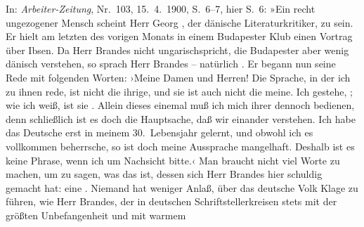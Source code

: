 \begin{ledgroupsized}[t]{13cm}
{{{                     In: \emph{Arbeiter-Zeitung}, Nr. 103,
                        15. 4. 1900, S. 6–7, hier S. 6: »Ein recht
                     ungezogener Mensch scheint Herr Georg , der dänische Literaturkritiker, zu
                     sein. Er hielt am letzten des vorigen Monats in einem Budapester Klub einen Vortrag über Ibsen. Da Herr Brandes nicht ungarischspricht, die Budapester aber wenig dänisch
                     verstehen, so sprach Herr Brandes –
                     natürlich . Er begann nun seine Rede mit
                     folgenden Worten: ›Meine Damen und Herren! Die Sprache, in der ich zu ihnen
                     rede, ist nicht die ihrige, und sie ist auch nicht die meine. Ich gestehe, ; wie
                     ich weiß, ist sie .
                     Allein dieses einemal muß ich mich ihrer dennoch bedienen, denn schließlich ist
                     es doch die Hauptsache, daß wir einander verstehen. Ich habe das Deutsche erst
                     in meinem 30. Lebensjahr gelernt, und obwohl ich es vollkommen beherrsche, so
                     ist doch meine Aussprache mangelhaft. Deshalb ist es keine Phrase, wenn ich um
                     Nachsicht bitte.‹ Man braucht nicht viel Worte zu machen, um zu sagen, was das
                     ist, dessen sich Herr Brandes hier schuldig
                     gemacht hat: eine . Niemand hat
                     weniger Anlaß, über das deutsche Volk Klage zu führen, wie Herr Brandes, der in deutschen
                     Schriftstellerkreisen stets mit der größten Unbefangenheit und mit warmem
}}}
\end{ledgroupsized}
